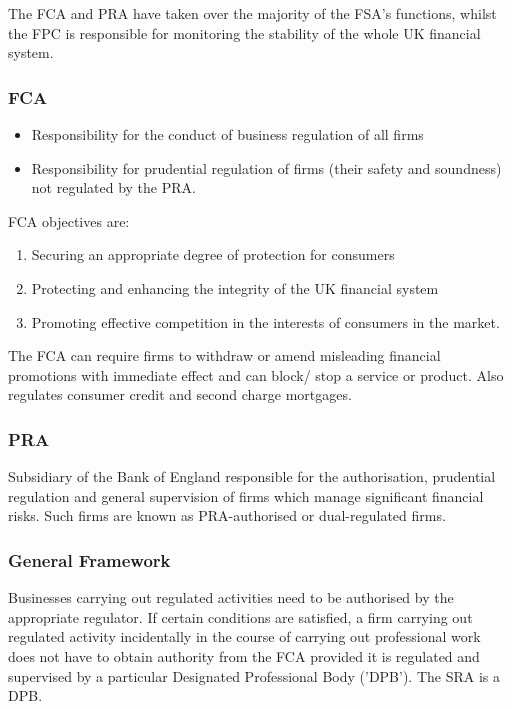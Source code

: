 \documentclass[
]{article}
\providecommand{\tightlist}{%
  \setlength{\itemsep}{0pt}\setlength{\parskip}{0pt}}
\begin{document}
The FCA and PRA have taken over the majority of the FSA's functions,
whilst the FPC is responsible for monitoring the stability of the whole
UK financial system.

\hypertarget{fca}{%
\subsubsection{FCA}\label{fca}}

\begin{itemize}
\tightlist
\item
  Responsibility for the conduct of business regulation of all firms
\item
  Responsibility for prudential regulation of firms (their safety and
  soundness) not regulated by the PRA.
\end{itemize}

FCA objectives are:

\begin{enumerate}
\tightlist
\item
  Securing an appropriate degree of protection for consumers
\item
  Protecting and enhancing the integrity of the UK financial system
\item
  Promoting effective competition in the interests of consumers in the
  market.
\end{enumerate}

The FCA can require firms to withdraw or amend misleading financial
promotions with immediate effect and can block/ stop a service or
product. Also regulates consumer credit and second charge mortgages.

\hypertarget{pra}{%
\subsubsection{PRA}\label{pra}}

Subsidiary of the Bank of England responsible for the authorisation,
prudential regulation and general supervision of firms which manage
significant financial risks. Such firms are known as PRA-authorised or
dual-regulated firms.

\hypertarget{general-framework}{%
\subsubsection{General Framework}\label{general-framework}}

Businesses carrying out regulated activities need to be authorised by
the appropriate regulator. If certain conditions are satisfied, a firm
carrying out regulated activity incidentally in the course of carrying
out professional work does not have to obtain authority from the FCA
provided it is regulated and supervised by a particular Designated
Professional Body ('DPB'). The SRA is a DPB.
\end{document}
